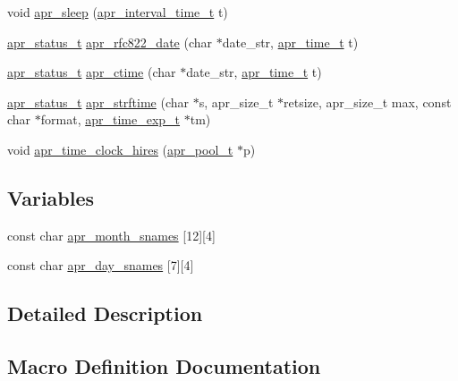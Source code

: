 \begin{DoxyCompactItemize}
\item 
void \hyperlink{group__apr__time_ga8ffddc239a3d8051d9972cee080fd761}{apr\+\_\+sleep} (\hyperlink{group__apr__time_gaae2129185a395cc393f76fabf4f43e47}{apr\+\_\+interval\+\_\+time\+\_\+t} t)
\item 
\hyperlink{group__apr__errno_gaf76ee4543247e9fb3f3546203e590a6c}{apr\+\_\+status\+\_\+t} \hyperlink{group__apr__time_gad77b323dd4402ac89c51240f19015df5}{apr\+\_\+rfc822\+\_\+date} (char $\ast$date\+\_\+str, \hyperlink{group__apr__time_gadb4bde16055748190eae190c55aa02bb}{apr\+\_\+time\+\_\+t} t)
\item 
\hyperlink{group__apr__errno_gaf76ee4543247e9fb3f3546203e590a6c}{apr\+\_\+status\+\_\+t} \hyperlink{group__apr__time_gad1fcb8f26d508fbb34ea2beca7bc851e}{apr\+\_\+ctime} (char $\ast$date\+\_\+str, \hyperlink{group__apr__time_gadb4bde16055748190eae190c55aa02bb}{apr\+\_\+time\+\_\+t} t)
\item 
\hyperlink{group__apr__errno_gaf76ee4543247e9fb3f3546203e590a6c}{apr\+\_\+status\+\_\+t} \hyperlink{group__apr__time_ga3f5e1aa45e735f3bcf8c13fb718c214f}{apr\+\_\+strftime} (char $\ast$s, apr\+\_\+size\+\_\+t $\ast$retsize, apr\+\_\+size\+\_\+t max, const char $\ast$format, \hyperlink{structapr__time__exp__t}{apr\+\_\+time\+\_\+exp\+\_\+t} $\ast$tm)
\item 
void \hyperlink{group__apr__time_gac47e0b54f17857f0ce2925b2930b5500}{apr\+\_\+time\+\_\+clock\+\_\+hires} (\hyperlink{group__apr__pools_gaf137f28edcf9a086cd6bc36c20d7cdfb}{apr\+\_\+pool\+\_\+t} $\ast$p)
\end{DoxyCompactItemize}
\subsection*{Variables}
\begin{DoxyCompactItemize}
\item 
const char \hyperlink{group__apr__time_ga77382d017a2bef80d44478e0b41557a4}{apr\+\_\+month\+\_\+snames} \mbox{[}12\mbox{]}\mbox{[}4\mbox{]}
\item 
const char \hyperlink{group__apr__time_ga37d6f7740ae0f5d8ae9cfc286e8712be}{apr\+\_\+day\+\_\+snames} \mbox{[}7\mbox{]}\mbox{[}4\mbox{]}
\end{DoxyCompactItemize}


\subsection{Detailed Description}


\subsection{Macro Definition Documentation}

